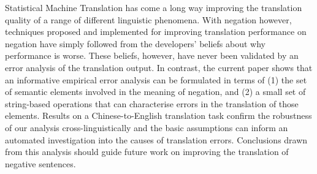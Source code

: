 Statistical Machine Translation has come a long way improving the translation quality of a range of different linguistic phenomena. With negation however, techniques proposed and implemented for improving translation performance on negation have simply followed from the developers' beliefs about why performance is worse. These beliefs, however, have never been validated by an error analysis of the translation output. In contrast, the current paper shows that an informative empirical error analysis can be formulated in terms of (1) the set of semantic elements involved in the meaning of negation, and (2) a small set of string-based operations that can characterise errors in the translation of those elements. Results on a Chinese-to-English translation task confirm the robustness of our analysis cross-linguistically and the basic assumptions can inform an automated investigation into the causes of translation errors. Conclusions drawn from this analysis should guide future work on improving the translation of negative sentences.
